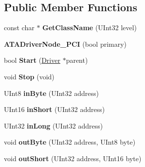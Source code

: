 \subsection*{Public Member Functions}
\begin{DoxyCompactItemize}
\item 
\mbox{\label{class_a_t_a_driver_node___p_c_i_a9ffff717b10d13bf6459bedaee3912e9}} 
const char $\ast$ {\bfseries Get\+Class\+Name} (U\+Int32 level)
\item 
\mbox{\label{class_a_t_a_driver_node___p_c_i_ab53db87dd2c34fe6bd9c3285945c9a3d}} 
{\bfseries A\+T\+A\+Driver\+Node\+\_\+\+P\+CI} (bool primary)
\item 
\mbox{\label{class_a_t_a_driver_node___p_c_i_ab683ba5ad25993c17e129400379f3a77}} 
bool {\bfseries Start} (\hyperlink{class_driver}{Driver} $\ast$parent)
\item 
\mbox{\label{class_a_t_a_driver_node___p_c_i_a390a544ec824d21aff0338f1c742b18f}} 
void {\bfseries Stop} (void)
\item 
\mbox{\label{class_a_t_a_driver_node___p_c_i_a38d02cbce526950bb2dbfc602567e56d}} 
U\+Int8 {\bfseries in\+Byte} (U\+Int32 address)
\item 
\mbox{\label{class_a_t_a_driver_node___p_c_i_a99a722f1bd82c4149657d74046451268}} 
U\+Int16 {\bfseries in\+Short} (U\+Int32 address)
\item 
\mbox{\label{class_a_t_a_driver_node___p_c_i_a12bdfd810a0cf2690a414544560df26b}} 
U\+Int32 {\bfseries in\+Long} (U\+Int32 address)
\item 
\mbox{\label{class_a_t_a_driver_node___p_c_i_a7edd942b48f5e6508b7485f40ac5d1ad}} 
void {\bfseries out\+Byte} (U\+Int32 address, U\+Int8 byte)
\item 
\mbox{\label{class_a_t_a_driver_node___p_c_i_a9746c4e2ef2a10fbaacfc06ad9b9203c}} 
void {\bfseries out\+Short} (U\+Int32 address, U\+Int16 byte)

\end{DoxyCompactItemize}
